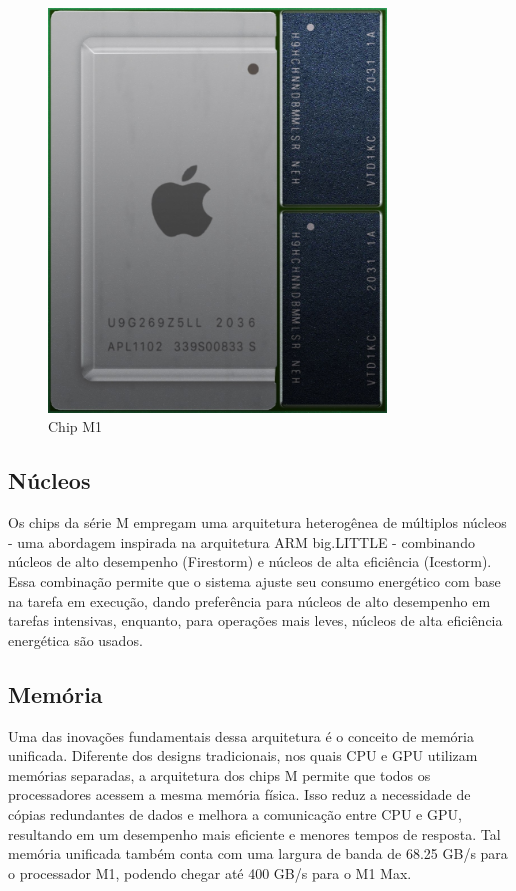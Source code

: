 \documentclass[a4paper,times,12pt]{article}
\begin{document}
\begin{figure}[h]
    \centering
    \includegraphics[width=0.8\textwidth]{./apple.jpeg}
    \caption{Chip M1}
    \label{fig:apple_m1}
\end{figure}

\subsection{Núcleos}
Os chips da série M empregam uma arquitetura heterogênea de múltiplos núcleos - uma abordagem inspirada na arquitetura ARM big.LITTLE - combinando núcleos de alto desempenho (Firestorm) e núcleos de alta eficiência (Icestorm). Essa combinação permite que o sistema ajuste seu consumo energético com base na tarefa em execução, dando preferência para núcleos de alto desempenho em tarefas intensivas, enquanto, para operações mais leves, núcleos de alta eficiência energética são usados.

\subsection{Memória}
Uma das inovações fundamentais dessa arquitetura é o conceito de memória unificada. Diferente dos designs tradicionais, nos quais CPU e GPU utilizam memórias separadas, a arquitetura dos chips M permite que todos os processadores acessem a mesma memória física. Isso reduz a necessidade de cópias redundantes de dados e melhora a comunicação entre CPU e GPU, resultando em um desempenho mais eficiente e menores tempos de resposta. Tal memória unificada também conta com uma largura de banda de 68.25 GB/s para o processador M1, podendo chegar até 400 GB/s para o M1 Max.
\end{document}
